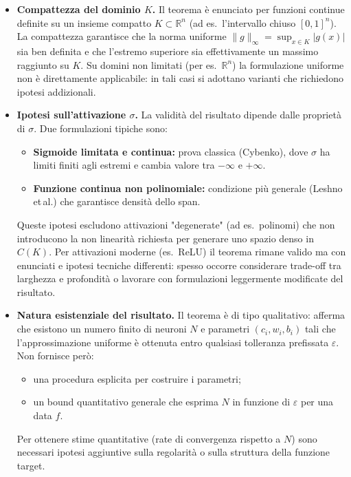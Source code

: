 \documentclass[a4paper,12pt]{report}
\begin{document}
	\begin{itemize}
		\item \textbf{Compattezza del dominio \(K\).} Il teorema è enunciato per funzioni continue definite su un insieme compatto \(K\subset\mathbb{R}^n\) (ad es.\ l'intervallo chiuso \([0,1]^n\)). La compattezza garantisce che la norma uniforme \(\|g\|_\infty=\sup_{x\in K}|g(x)|\) sia ben definita e che l'estremo superiore sia effettivamente un massimo raggiunto su \(K\). Su domini non limitati (per es.\ \(\mathbb{R}^n\)) la formulazione uniforme non è direttamente applicabile: in tali casi si adottano varianti che richiedono ipotesi addizionali.
		
		\item \textbf{Ipotesi sull'attivazione \(\sigma\).} La validità del risultato dipende dalle proprietà di \(\sigma\). Due formulazioni tipiche sono:
		\begin{itemize}
			\item \textbf{Sigmoide limitata e continua:} prova classica (Cybenko), dove \(\sigma\) ha limiti finiti agli estremi e cambia valore tra \(-\infty\) e \(+\infty\).
			\item \textbf{Funzione continua non polinomiale:} condizione più generale (Leshno et\,al.) che garantisce densità dello span.
		\end{itemize}
		Queste ipotesi escludono attivazioni "degenerate" (ad es.\ polinomi) che non introducono la non linearità richiesta per generare uno spazio denso in \(C(K)\). Per attivazioni moderne (es.\ ReLU) il teorema rimane valido ma con enunciati e ipotesi tecniche differenti: spesso occorre considerare trade-off tra larghezza e profondità o lavorare con formulazioni leggermente modificate del risultato.
		
		\item \textbf{Natura esistenziale del risultato.} Il teorema è di tipo qualitativo: afferma che esistono un numero finito di neuroni \(N\) e parametri \((c_i,w_i,b_i)\) tali che l'approssimazione uniforme è ottenuta entro qualsiasi tolleranza prefissata \(\varepsilon\). Non fornisce però:
		\begin{itemize}
			\item una procedura esplicita per costruire i parametri;
			\item un bound quantitativo generale che esprima \(N\) in funzione di \(\varepsilon\) per una data \(f\).
		\end{itemize}
		Per ottenere stime quantitative (rate di convergenza rispetto a \(N\)) sono necessari ipotesi aggiuntive sulla regolarità o sulla struttura della funzione target.
		

\end{itemize}
\end{document}
